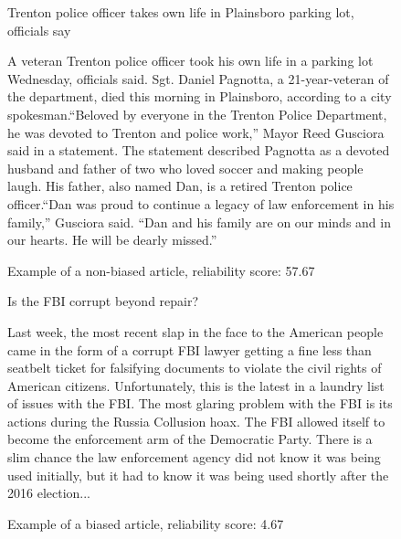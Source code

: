 \begin{figure}[htbp]
    \centering
    \begin{minipage}{0.9\linewidth}
        \begin{center}
            \small{Trenton police officer takes own life in Plainsboro parking lot, officials say}
        \end{center}
        \scriptsize{
            A veteran Trenton police officer took his own life in a parking lot Wednesday, officials said. Sgt. Daniel Pagnotta, a 21-year-veteran of the department, died this morning in Plainsboro, according to a city spokesman.“Beloved by everyone in the Trenton Police Department, he was devoted to Trenton and police work,” Mayor Reed Gusciora said in a statement. The statement described Pagnotta as a devoted husband and father of two who loved soccer and making people laugh. His father, also named Dan, is a retired Trenton police officer.“Dan was proud to continue a legacy of law enforcement in his family,” Gusciora said. “Dan and his family are on our minds and in our hearts. He will be dearly missed.”}
    \end{minipage}
    \caption{Example of a non-biased article, reliability score: 57.67}
    \label{fig:example-nonbiased-article-1}
\end{figure}

\begin{figure}[htbp]
    \centering
    \begin{minipage}{0.9\linewidth}
        \begin{center}
            \small{Is the FBI corrupt beyond repair?}
        \end{center}
        \scriptsize{
            Last week, the most recent slap in the face to the American people came in the form of a corrupt FBI lawyer getting a fine less than seatbelt ticket for falsifying documents to violate the civil rights of American citizens. Unfortunately, this is the latest in a laundry list of issues with the FBI. The most glaring problem with the FBI is its actions during the Russia Collusion hoax. The FBI allowed itself to become the enforcement arm of the Democratic Party. There is a slim chance the law enforcement agency did not know it was being used initially, but it had to know it was being used shortly after the 2016 election...
        }
    \end{minipage}
    \caption{Example of a biased article, reliability score: 4.67}
    \label{fig:example-biased-article-1}
\end{figure}



